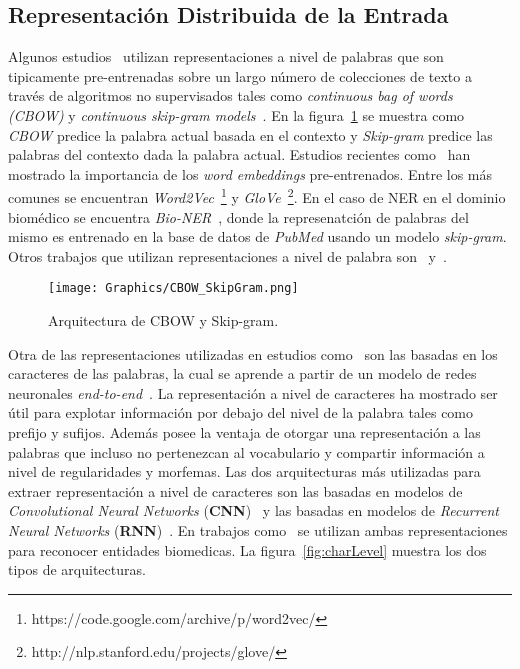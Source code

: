 \subsection{Representaci\'on Distribuida de la Entrada}


Algunos estudios~\cite{strubell2017fast} utilizan representaciones a nivel de palabras que son tipicamente pre-entrenadas sobre un largo n\'umero de colecciones de texto a trav\'es de algoritmos no supervisados tales como \emph{continuous bag of words (CBOW)} y \emph{continuous skip-gram models}~\cite{mikolov2013efficient}. En la figura~\ref{fig:cbowSkip} se muestra como \emph{CBOW} predice la palabra actual basada en el contexto y \emph{Skip-gram} predice las palabras del contexto dada la palabra actual. Estudios recientes como~\cite{yang2018design} han mostrado la importancia de los \emph{word embeddings} pre-entrenados. Entre los m\'as comunes se encuentran \emph{Word2Vec}~\footnote{https://code.google.com/archive/p/word2vec/} y \emph{GloVe}~\footnote{http://nlp.stanford.edu/projects/glove/}. En el caso de NER en el dominio biom\'edico se encuentra \emph{Bio-NER}~\cite{yao2015biomedical}, donde la represenatci\'on de palabras del mismo es entrenado en la base de datos de \emph{PubMed} usando un modelo \emph{skip-gram}. Otros trabajos que utilizan  representaciones a nivel de palabra son~\cite{ma2016end} y~\cite{wang2018code}.

\begin{figure}[h!]
	\centering
	\texttt{[image: Graphics/CBOW\_SkipGram.png]}
	\caption{Arquitectura de CBOW y Skip-gram.}\label{fig:cbowSkip}
\end{figure}


Otra de las representaciones utilizadas en estudios como~\cite{li2018segbot} son las basadas en los caracteres de las palabras, la cual se aprende a partir de un modelo de redes neuronales \emph{end-to-end}~\cite{li2018survey}. La representaci\'on a nivel de caracteres ha mostrado ser \'util para explotar informaci\'on por debajo del nivel de la palabra tales como prefijo y sufijos. Adem\'as posee la ventaja de otorgar una representaci\'on a las palabras que incluso no pertenezcan al vocabulario y compartir informaci\'on a nivel de regularidades y morfemas. Las dos arquitecturas m\'as utilizadas para extraer representaci\'on a nivel de caracteres son las basadas en modelos de \emph{Convolutional Neural Networks} (\textbf{CNN})~\cite{ma2016end} y las basadas en modelos de \emph{Recurrent Neural Networks} (\textbf{RNN})~\cite{lample2016neural}. En trabajos como~\cite{gridach2017character} se utilizan ambas representaciones para reconocer entidades biomedicas. La figura~\ref{fig:charLevel} muestra los dos tipos de arquitecturas.

